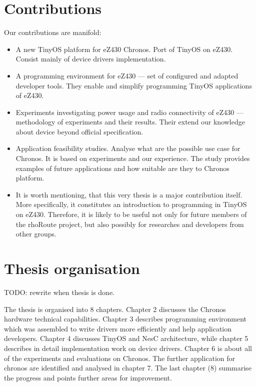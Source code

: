 \section{Contributions}
Our contributions are manifold:
\begin{itemize}
  \item A new TinyOS platform for eZ430 Chronos. Port of TinyOS on eZ430. Consist mainly of device drivers implementation.
  \item A programming environment for eZ430 --- set of configured and adapted developer tools. They enable and simplify programming TinyOS applications of eZ430.
  \item Experiments investigating power usage and radio connectivity of eZ430 --- methodology of experiments and their results. Their extend our knowledge about device beyond official specification.
  \item Application feasibility studies. Analyse what are the possible use case for Chronos. It is based on experiments and our experience. The study provides examples of future applications and how suitable are they to Chronos platform.
  \item It is worth mentioning, that this very thesis is a major contribution itself. More specifically, it constitutes an introduction to programming in TinyOS on eZ430. Therefore, it is likely to be useful not only for future members of the rhoRoute project, but also possibly for researches and developers from other groups.
\end{itemize}

\section{Thesis organisation}
TODO: rewrite when thesis is done.

The thesis is organised into 8 chapters. Chapter 2 discusses the Chronos hardware technical capabilities. Chapter 3 describes programming environment which was assembled to write drivers more efficiently and help application developers. Chapter 4 discusses TinyOS and NesC architecture, while chapter 5 describes in detail implementation work on device drivers. Chapter 6 is about all of the experiments and evaluations on Chronos. The further application for chronos are identified and analysed in chapter 7. The last chapter (8) summarise the progress and points further areas for improvement.
